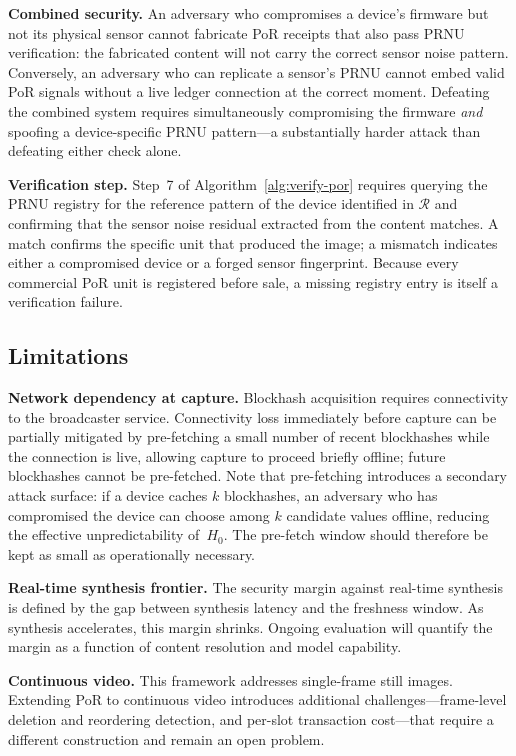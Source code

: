 \documentclass[11pt]{article}
\begin{document}
\textbf{Combined security.} An adversary who compromises a device's firmware
but not its physical sensor cannot fabricate PoR receipts that also pass PRNU
verification: the fabricated content will not carry the correct sensor noise
pattern. Conversely, an adversary who can replicate a sensor's PRNU cannot
embed valid PoR signals without a live ledger connection at the correct moment.
Defeating the combined system requires simultaneously compromising the firmware
\emph{and} spoofing a device-specific PRNU pattern---a substantially harder
attack than defeating either check alone.

\textbf{Verification step.} Step~7 of Algorithm~\ref{alg:verify-por} requires
querying the PRNU registry for the reference pattern of the device identified
in $\mathcal{R}$ and confirming that the sensor noise residual extracted from
the content matches. A match confirms the specific unit that produced the
image; a mismatch indicates either a compromised device or a forged sensor
fingerprint. Because every commercial PoR unit is registered before sale,
a missing registry entry is itself a verification failure.

\subsection{Limitations}
\label{sec:limitations}

\textbf{Network dependency at capture.} Blockhash acquisition requires connectivity
to the broadcaster service. Connectivity loss immediately before capture can be
partially mitigated by pre-fetching a small number of recent blockhashes while
the connection is live, allowing capture to proceed briefly offline; future
blockhashes cannot be pre-fetched. Note that pre-fetching introduces a
secondary attack surface: if a device caches $k$ blockhashes, an adversary who
has compromised the device can choose among $k$ candidate values offline,
reducing the effective unpredictability of~$H_0$. The pre-fetch window should
therefore be kept as small as operationally necessary.

\textbf{Real-time synthesis frontier.} The security margin against real-time
synthesis is defined by the gap between synthesis latency and the
freshness window. As synthesis accelerates, this margin shrinks. Ongoing
evaluation will quantify the margin as a function of content resolution and
model capability.

\textbf{Continuous video.} This framework addresses single-frame still images.
Extending PoR to continuous video introduces additional challenges---frame-level
deletion and reordering detection, and per-slot transaction cost---that require
a different construction and remain an open problem.
\end{document}
